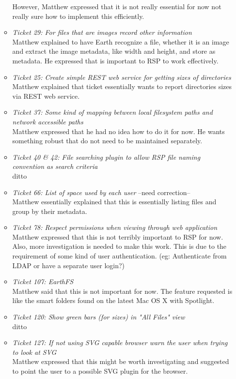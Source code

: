 \documentclass{letter}
\begin{document}
\begin{enumerate}
\begin{itemize}
	However, Matthew expressed that it is not really essential for now not really sure how to implement this efficiently. 
	\item \textit{Ticket 29: For files that are images record other information} \\
	Matthew explained to have Earth recognize a file, whether it is an image and extract the image metadata, like width and height, and store as metadata. He expressed that is important to RSP to work effectively. 
	\item \textit{Ticket 25: Create simple REST web service for getting sizes of directories} \\
	Matthew explained that ticket essentially wants to report directories sizes via REST web service. 
	\item \textit{Ticket 37: Some kind of mapping between local filesystem paths and network accessible paths} \\
	Matthew expressed that he had no idea how to do it for now. He wants something robust that do not need to be maintained separately. 
	\item \textit{Ticket 40 \& 42: File searching plugin to allow RSP file naming convention as search criteria} \\
	ditto
	\item \textit{Ticket 66: List of space used by each user} --need correction-- \\
	Matthew essentially explained that this is essentially listing files and group by their metadata.
	\item \textit{Ticket 78: Respect permissions when viewing through web application} \\
	Matthew expressed that this is not terribly important to RSP for now. Also, more investigation is needed to make this work. This is due to the requirement of some kind of user authentication. (eg: Authenticate from LDAP or have a separate user login?)
	\item \textit{Ticket 107: EarthFS} \\
	Matthew said that this is not important for now. The feature requested is like the smart folders found on the latest Mac OS X with Spotlight. 
	\item \textit{Ticket 120: Show green bars (for sizes) in "All Files" view} \\
	ditto
	\item \textit{Ticket 127: If not using SVG capable browser warn the user when trying to look at SVG} \\
	Matthew expressed that this might be worth investigating and suggested to point the user to a possible SVG plugin for the browser.

\end{itemize}
\end{enumerate}
\end{document}
